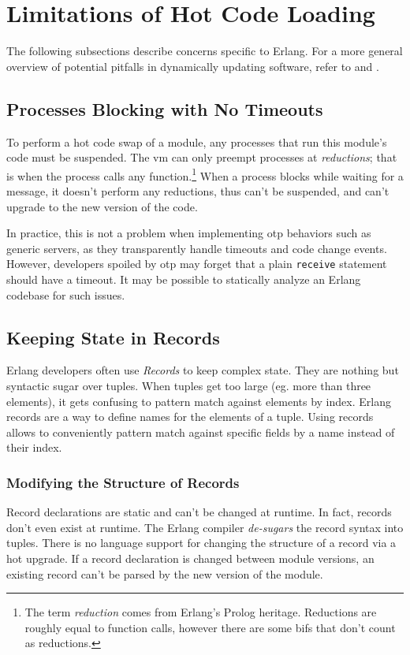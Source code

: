\section{Limitations of Hot Code Loading}

The following subsections describe concerns specific to Erlang. For a more general overview of potential pitfalls in dynamically updating software, refer to \cite{gregersen:phenomena} and \cite{hicks}.

\subsection{Processes Blocking with No Timeouts}

To perform a hot code swap of a module, any processes that run this module's code must be suspended. The \acrshort{vm} can only preempt processes at \emph{reductions}; that is when the process calls any function.\footnote{The term \emph{reduction} comes from Erlang's Prolog heritage. Reductions are roughly equal to function calls, however there are some \acrshort{bif}s that don't count as reductions.} When a process blocks while waiting for a message, it doesn't perform any reductions, thus can't be suspended, and can't upgrade to the new version of the code.

In practice, this is not a problem when implementing \acrshort{otp} behaviors such as generic servers, as they transparently handle timeouts and code change events. However, developers spoiled by \acrshort{otp} may forget that a plain \lstinline|receive| statement should have a timeout. It may be possible to statically analyze an Erlang codebase for such issues.

\subsection{Keeping State in Records}

Erlang developers often use \emph{Records} to keep complex state. They are nothing but syntactic sugar over tuples. When tuples get too large (eg. more than three elements), it gets confusing to pattern match against elements by index. Erlang records are a way to define names for the elements of a tuple. Using records allows to conveniently pattern match against specific fields by a name instead of their index.


\subsubsection{Modifying the Structure of Records}
Record declarations are static and can't be changed at runtime. In fact, records don't even exist at runtime. The Erlang compiler \emph{de-sugars} the record syntax into tuples. There is no language support for changing the structure of a record via a hot upgrade. If a record declaration is changed between module versions, an existing record can't be parsed by the new version of the module.

